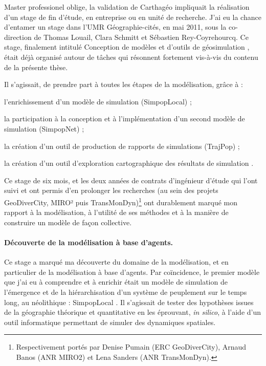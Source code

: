 Master professionel oblige, la validation de Carthagéo impliquait la réalisation d'un stage de fin d'étude, en entreprise ou en unité de recherche.
J'ai eu la chance d'entamer un stage dans l'UMR Géographie-cités, en mai 2011, sous la co-direction de Thomas Louail, Clara Schmitt et Sébastien Rey-Coyrehourcq.
Ce stage, finalement intitulé \og Conception de modèles et d'outils de géosimulation \fg{} \autocite{cura_conception_2011}, était déjà organisé autour de tâches qui résonnent fortement vis-à-vis du contenu de la présente thèse.

Il s'agissait, de \og prendre part à toutes les étapes de la modélisation\fg{}, grâce à :
\begin{compactenum}\vspace*{-.5em}
\item l'enrichissement d'un modèle de simulation (SimpopLocal) ;
\item la participation à la conception et à l'implémentation d'un second modèle de simulation (SimpopNet) ;
\item la création d'un outil de production de rapports de simulations (TrajPop) ;
\item la création d'un outil d'exploration cartographique des résultats de simulation \autocite[12-13]{cura_conception_2011}.
\end{compactenum}\vspace*{-.5em}
Ce stage de six mois, et les deux années de contrats d'ingénieur d'étude qui l'ont suivi et ont permis d'en prolonger les recherches (au sein des projets GeoDiverCity, MIRO² puis TransMonDyn)\footnote{
	Respectivement portés par Denise Pumain (ERC GeoDiverCity), Arnaud Banos (ANR MIRO2) et Lena Sanders (ANR TransMonDyn).
} ont durablement marqué mon rapport à la modélisation, à l'utilité de ses méthodes et à la manière de construire un modèle de façon collective.

\paragraph{Découverte de la modélisation à base d'agents.}

Ce stage a marqué ma découverte du domaine de la modélisation, et en particulier de la modélisation à base d'agents.
Par coïncidence, le premier modèle que j'ai eu à comprendre et à enrichir était un modèle de simulation de l'émergence et de la hiérarchisation d'un système de peuplement sur le temps long, au néolithique : SimpopLocal \autocite{schmitt_modelisation_2014,rey-coyrehourcq_plateforme_2015}.
Il s'agissait de tester des hypothèses issues de la géographie théorique et quantitative en les éprouvant, \textit{in silico}, à l'aide d'un outil informatique permettant de simuler des dynamiques spatiales.

